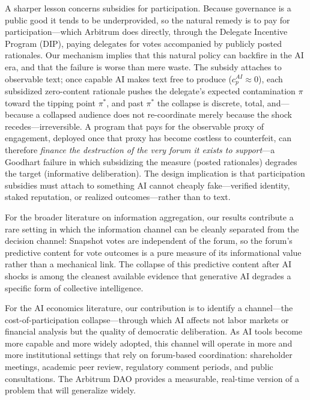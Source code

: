 \documentclass[12pt]{article}
\begin{document}
A sharper lesson concerns subsidies for participation. Because governance is a
public good it tends to be underprovided, so the natural remedy is to pay for
participation---which Arbitrum does directly, through the Delegate Incentive Program
(DIP), paying delegates for votes accompanied by publicly posted rationales. Our
mechanism implies that this natural policy can backfire in the AI era, and that the
failure is worse than mere waste. The subsidy attaches to observable text; once
capable AI makes text free to produce ($c_p^{AI} \approx 0$), each subsidized
zero-content rationale pushes the delegate's expected contamination $\pi$ toward the
tipping point $\pi^*$, and past $\pi^*$ the collapse is discrete, total, and---because a collapsed audience does not re-coordinate merely because the shock recedes---irreversible. A program
that pays for the observable proxy of engagement, deployed once that proxy has become
costless to counterfeit, can therefore \emph{finance the destruction of the very
forum it exists to support}---a Goodhart failure in which subsidizing the measure
(posted rationales) degrades the target (informative deliberation). The design
implication is that participation subsidies must attach to something AI cannot
cheaply fake---verified identity, staked reputation, or realized outcomes---rather
than to text.

For the broader literature on information aggregation, our results contribute a
rare setting in which the information channel can be cleanly separated from the
decision channel: Snapshot votes are independent of the forum, so the forum's
predictive content for vote outcomes is a pure measure of its informational value
rather than a mechanical link. The collapse of this predictive content after AI
shocks is among the cleanest available evidence that generative AI degrades a
specific form of collective intelligence.

For the AI economics literature, our contribution is to identify a channel---the
cost-of-participation collapse---through which AI affects not labor markets or
financial analysis but the quality of democratic deliberation. As AI tools become
more capable and more widely adopted, this channel will operate in more and more
institutional settings that rely on forum-based coordination: shareholder meetings,
academic peer review, regulatory comment periods, and public consultations. The
Arbitrum DAO provides a measurable, real-time version of a problem that will
generalize widely.
\end{document}

